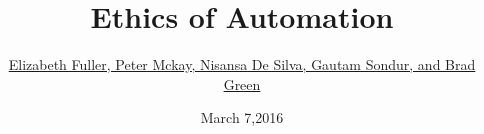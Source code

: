 \title[Ethical Automation]{Ethics of Automation}
\author{
\underline{Elizabeth Fuller, Peter Mckay, Nisansa De Silva, Gautam Sondur, and Brad Green}
}

\date[March 7,2016]{March 7,2016}

\frame{\titlepage}

